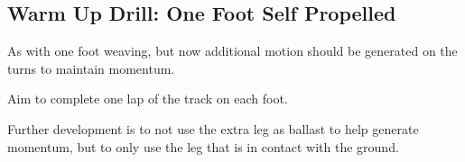 \subsection*{Warm Up Drill: One Foot Self Propelled} 

As with one foot weaving, but now additional motion should be generated on the turns to maintain momentum.  

Aim to complete one lap of the track on each foot.

Further development is to not use the extra leg as ballast to help generate momentum, but to only use the leg that is in contact with the ground. 
